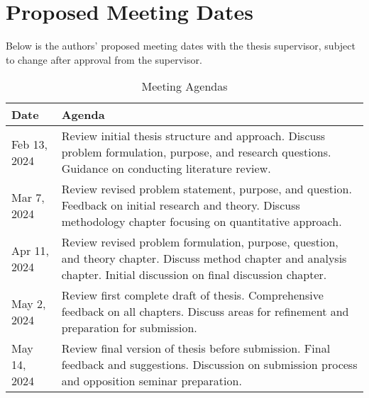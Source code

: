 \break
\section{Proposed Meeting Dates}

Below is the authors' proposed meeting dates with the thesis supervisor, subject to change after approval from the supervisor. 

\begin{table}[h]
\centering
\begin{tabular}{|l|p{10cm}|}
\hline
\textbf{Date}         & \textbf{Agenda}                                                                                               \\ \hline
Feb 13, 2024          & Review initial thesis structure and approach. Discuss problem formulation, purpose, and research questions. Guidance on conducting literature review. \\ \hline
Mar 7, 2024           & Review revised problem statement, purpose, and question. Feedback on initial research and theory. Discuss methodology chapter focusing on quantitative approach. \\ \hline
Apr 11, 2024          & Review revised problem formulation, purpose, question, and theory chapter. Discuss method chapter and analysis chapter. Initial discussion on final discussion chapter. \\ \hline
May 2, 2024           & Review first complete draft of thesis. Comprehensive feedback on all chapters. Discuss areas for refinement and preparation for submission. \\ \hline
May 14, 2024          & Review final version of thesis before submission. Final feedback and suggestions. Discussion on submission process and opposition seminar preparation. \\ \hline
\end{tabular}
\caption{Meeting Agendas}
\label{tab:meeting_agendas}
\end{table}

